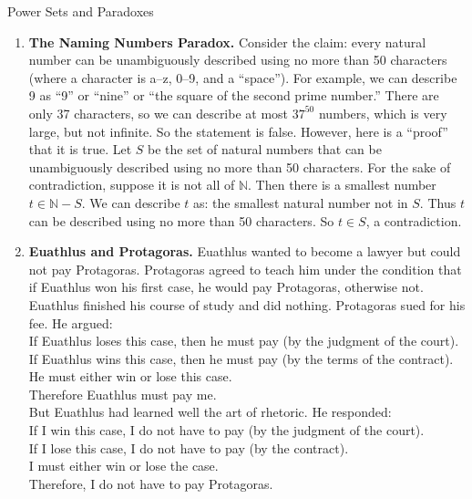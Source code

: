\begin{section}{Power Sets and Paradoxes}
\begin{problem}
\begin{enumerate}[label=\textrm{(\alph*)}]
\item \textbf{The Naming Numbers Paradox.} Consider the claim: every natural number can be unambiguously described using no more than 50 characters (where a character is a--z, 0--9, and a ``space''). For example, we can describe 9 as ``9'' or ``nine'' or ``the square of the second prime number.'' There are only 37 characters, so we can describe at most $37^{50}$ numbers, which is very large, but not infinite. So the statement is false. However, here is a ``proof'' that it is true. Let $S$ be the set of natural numbers that can be unambiguously described using no more than 50 characters. For the sake of contradiction, suppose it is not all of $\mathbb{N}$. Then there is a smallest number $t\in\mathbb{N}-S$. We can describe $t$ as: the smallest natural number not in $S$.  Thus $t$ can be described using no more than 50 characters. So $t\in S$, a contradiction.

\item \textbf{Euathlus and Protagoras.} Euathlus wanted to become a lawyer but could not pay Protagoras. Protagoras agreed to teach him under the condition that if Euathlus won his first case, he would pay Protagoras, otherwise not. Euathlus finished his course of study and did nothing. Protagoras sued for his fee. He argued:\\

\noindent If Euathlus loses this case, then he must pay (by the judgment of the court).\\
If Euathlus wins this case, then he must pay (by the terms of the contract).\\
He must either win or lose this case.\\
Therefore Euathlus must pay me.\\

\noindent But Euathlus had learned well the art of rhetoric. He responded:\\

\noindent If I win this case, I do not have to pay (by the judgment of the court).\\
If I lose this case, I do not have to pay (by the contract).\\
I must either win or lose the case.\\
Therefore, I do not have to pay Protagoras.
\end{enumerate}
\end{problem}

\end{section}
